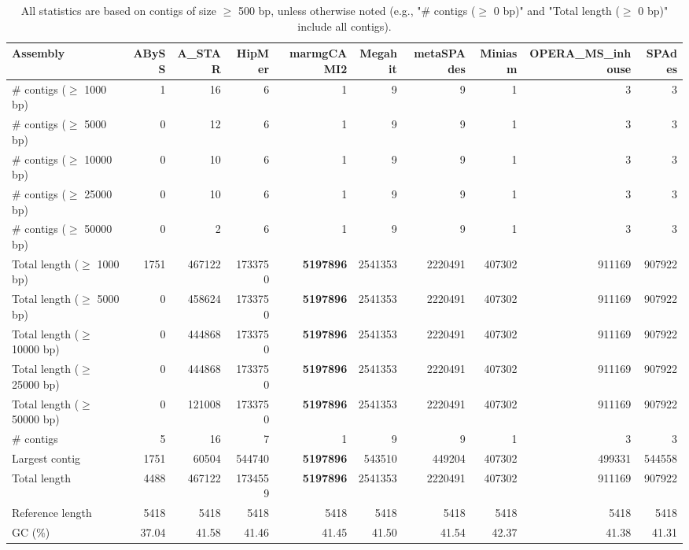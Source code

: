 \documentclass[12pt,a4paper]{article}
\begin{document}
\begin{table}[ht]
\begin{center}
\caption{All statistics are based on contigs of size $\geq$ 500 bp, unless otherwise noted (e.g., "\# contigs ($\geq$ 0 bp)" and "Total length ($\geq$ 0 bp)" include all contigs).}
\begin{tabular}{|l*{9}{|r}|}
\hline
Assembly & ABySS & A\_STAR & HipMer & marmgCAMI2 & Megahit & metaSPAdes & Miniasm & OPERA\_MS\_inhouse & SPAdes \\ \hline
\# contigs ($\geq$ 1000 bp) & 1 & 16 & 6 & 1 & 9 & 9 & 1 & 3 & 3 \\ \hline
\# contigs ($\geq$ 5000 bp) & 0 & 12 & 6 & 1 & 9 & 9 & 1 & 3 & 3 \\ \hline
\# contigs ($\geq$ 10000 bp) & 0 & 10 & 6 & 1 & 9 & 9 & 1 & 3 & 3 \\ \hline
\# contigs ($\geq$ 25000 bp) & 0 & 10 & 6 & 1 & 9 & 9 & 1 & 3 & 3 \\ \hline
\# contigs ($\geq$ 50000 bp) & 0 & 2 & 6 & 1 & 9 & 9 & 1 & 3 & 3 \\ \hline
Total length ($\geq$ 1000 bp) & 1751 & 467122 & 1733750 & {\bf 5197896} & 2541353 & 2220491 & 407302 & 911169 & 907922 \\ \hline
Total length ($\geq$ 5000 bp) & 0 & 458624 & 1733750 & {\bf 5197896} & 2541353 & 2220491 & 407302 & 911169 & 907922 \\ \hline
Total length ($\geq$ 10000 bp) & 0 & 444868 & 1733750 & {\bf 5197896} & 2541353 & 2220491 & 407302 & 911169 & 907922 \\ \hline
Total length ($\geq$ 25000 bp) & 0 & 444868 & 1733750 & {\bf 5197896} & 2541353 & 2220491 & 407302 & 911169 & 907922 \\ \hline
Total length ($\geq$ 50000 bp) & 0 & 121008 & 1733750 & {\bf 5197896} & 2541353 & 2220491 & 407302 & 911169 & 907922 \\ \hline
\# contigs & 5 & 16 & 7 & 1 & 9 & 9 & 1 & 3 & 3 \\ \hline
Largest contig & 1751 & 60504 & 544740 & {\bf 5197896} & 543510 & 449204 & 407302 & 499331 & 544558 \\ \hline
Total length & 4488 & 467122 & 1734559 & {\bf 5197896} & 2541353 & 2220491 & 407302 & 911169 & 907922 \\ \hline
Reference length & 5418 & 5418 & 5418 & 5418 & 5418 & 5418 & 5418 & 5418 & 5418 \\ \hline
GC (\%) & 37.04 & 41.58 & 41.46 & 41.45 & 41.50 & 41.54 & 42.37 & 41.38 & 41.31 \\ \hline

\end{tabular}
\end{center}
\end{table}
\end{document}
